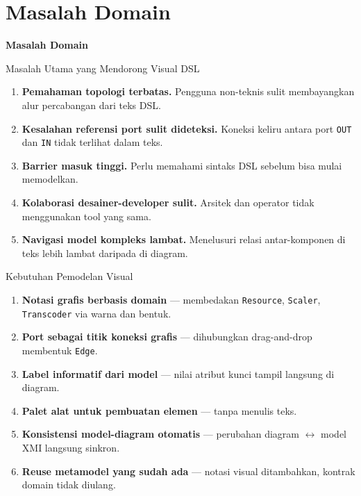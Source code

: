\documentclass[aspectratio=169, table]{beamer}
\begin{document}
\section{Masalah Domain}
\begin{frame}{\hfill}
	\centering
	\Huge{\textbf{Masalah Domain}}
\end{frame}

\begin{frame}{Masalah Utama yang Mendorong Visual DSL}
\vspace{6pt}
\begin{enumerate}
  \item \textbf{Pemahaman topologi terbatas.} Pengguna non-teknis sulit membayangkan alur percabangan dari teks DSL.
  \item \textbf{Kesalahan referensi port sulit dideteksi.} Koneksi keliru antara port \texttt{OUT} dan \texttt{IN} tidak terlihat dalam teks.
  \item \textbf{Barrier masuk tinggi.} Perlu memahami sintaks DSL sebelum bisa mulai memodelkan.
  \item \textbf{Kolaborasi desainer-developer sulit.} Arsitek dan operator tidak menggunakan tool yang sama.
  \item \textbf{Navigasi model kompleks lambat.} Menelusuri relasi antar-komponen di teks lebih lambat daripada di diagram.
\end{enumerate}
\end{frame}

\begin{frame}{Kebutuhan Pemodelan Visual}
\vspace{6pt}
\begin{enumerate}
  \item \textbf{Notasi grafis berbasis domain} --- membedakan \texttt{Resource}, \texttt{Scaler}, \texttt{Transcoder} via warna dan bentuk.
  \item \textbf{Port sebagai titik koneksi grafis} --- dihubungkan drag-and-drop membentuk \texttt{Edge}.
  \item \textbf{Label informatif dari model} --- nilai atribut kunci tampil langsung di diagram.
  \item \textbf{Palet alat untuk pembuatan elemen} --- tanpa menulis teks.
  \item \textbf{Konsistensi model-diagram otomatis} --- perubahan diagram $\leftrightarrow$ model XMI langsung sinkron.
  \item \textbf{Reuse metamodel yang sudah ada} --- notasi visual ditambahkan, kontrak domain tidak diulang.
\end{enumerate}
\end{frame}
\end{document}
